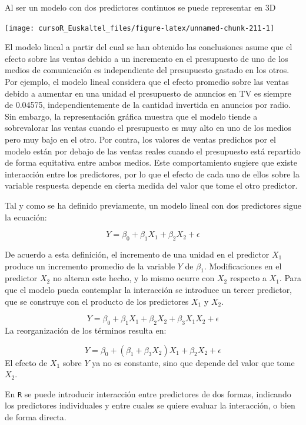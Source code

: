 \documentclass[]{book}
\begin{document}
Al ser un modelo con dos predictores continuos se puede representar en
3D

\begin{center}\texttt{[image: cursoR\_Euskaltel\_files/figure-latex/unnamed-chunk-211-1]} \end{center}

El modelo lineal a partir del cual se han obtenido las conclusiones
asume que el efecto sobre las ventas debido a un incremento en el
presupuesto de uno de los medios de comunicación es independiente del
presupuesto gastado en los otros. Por ejemplo, el modelo lineal
considera que el efecto promedio sobre las ventas debido a aumentar en
una unidad el presupuesto de anuncios en TV es siempre de 0.04575,
independientemente de la cantidad invertida en anuncios por radio. Sin
embargo, la representación gráfica muestra que el modelo tiende a
sobrevalorar las ventas cuando el presupuesto es muy alto en uno de los
medios pero muy bajo en el otro. Por contra, los valores de ventas
predichos por el modelo están por debajo de las ventas reales cuando el
presupuesto está repartido de forma equitativa entre ambos medios. Este
comportamiento sugiere que existe interacción entre los predictores, por
lo que el efecto de cada uno de ellos sobre la variable respuesta
depende en cierta medida del valor que tome el otro predictor.

Tal y como se ha definido previamente, un modelo lineal con dos
predictores sigue la ecuación:

\[
Y={\beta}_0+ \beta_1 X_1+ \beta_2 X_2+ \epsilon
\]

De acuerdo a esta definición, el incremento de una unidad en el
predictor \(X_1\) produce un incremento promedio de la variable \(Y\) de
\(\beta_1\). Modificaciones en el predictor \(X_2\) no alteran este
hecho, y lo mismo ocurre con \(X_2\) respecto a \(X_1\). Para que el
modelo pueda contemplar la interacción se introduce un tercer predictor,
que se construye con el producto de los predictores \(X_1\) y \(X_2\).

\[
Y=\beta_0+\beta_1 X_1+\beta_2 X_2+ \beta_3 X_1X_2+\epsilon
\] La reorganización de los términos resulta en:

\[
  Y=\beta_0+(\beta_1+\beta_3 X_2)X_1+\beta_2X_2+\epsilon
\] El efecto de \(X_1\) sobre \(Y\) ya no es constante, sino que depende
del valor que tome \(X_2\).

En \texttt{R} se puede introducir interacción entre predictores de dos
formas, indicando los predictores individuales y entre cuales se quiere
evaluar la interacción, o bien de forma directa.
\end{document}
